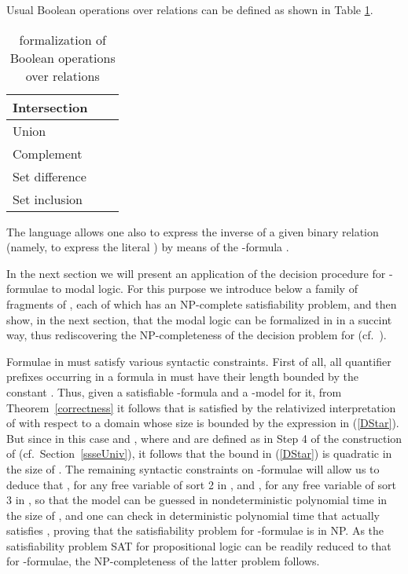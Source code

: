 \documentclass{fundam}
\begin{document}
Usual Boolean operations over relations can be defined as shown in
Table \ref{tab:Bolop}.
\begin{table}[tb]
\begin{center}
\begin{tabular}{|l|l|l|}
  \hline
Intersection &  & \\\hline
Union &  & \\\hline
Complement &  &  \\\hline
Set difference &  & \\\hline
Set inclusion &   & \\
 \hline
\end{tabular}
\caption{\label{tab:Bolop}  formalization of Boolean operations over relations}
\end{center}
\end{table}
The language  allows one also to express the inverse
 of a given binary relation  (namely, to express
the literal ) by means of the
-formula .

In the next section we will present an application of the decision
procedure for -formulae to modal logic.
For this purpose we introduce below a family  of fragments of , each of which has an
\textsf{NP}-complete satisfiability problem, and then show, in the
next section, that the modal logic  can be formalized in
 in a succint way, thus rediscovering the
\textsf{NP}-completeness of the decision problem for  (cf.\
\cite{Lad77}).

Formulae in  must satisfy various syntactic constraints.
First of all, all quantifier prefixes occurring in a formula in
 must have their length bounded by the constant .
Thus, given a satisfiable -formula  and a
-model  for it, from
Theorem~\ref{correctness} it follows that  is satisfied by
the relativized interpretation  of 
with respect to a domain  whose size is bounded by the
expression in (\ref{DStar}).  But since in this case 
and , where  and  are defined as in Step 4
of the construction of  (cf.\ Section~\ref{ssseUniv}), it
follows that the bound in (\ref{DStar}) is quadratic in the size of
.  The remaining syntactic constraints on
-formulae will allow us to deduce that , for any free variable  of sort 2 in
, and , for
any free variable  of sort 3 in , so that the model
 can be guessed in nondeterministic polynomial time in the
size of , and one can check in deterministic polynomial time
that  actually satisfies , proving that the
satisfiability problem for -formulae is in \textsf{NP}.
As the satisfiability problem \textsf{SAT} for propositional logic can
be readily reduced to that for -formulae, the
\textsf{NP}-completeness of the latter problem follows.
\end{document}
